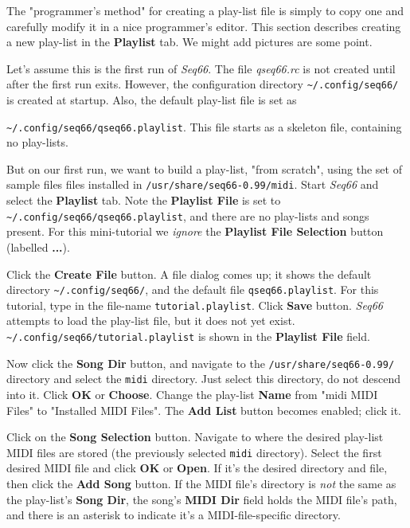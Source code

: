    The "programmer's method" for creating a play-list file is simply to copy
   one and carefully modify it in a nice programmer's editor.
   This section describes creating a new play-list in the \textbf{Playlist}
   tab.  We might add pictures are some point.

   Let's assume this is the first run of \textsl{Seq66}.
   The file \textsl{qseq66.rc} is not created until after the first
   run exits.
   However, the configuration directory
   \texttt{\textasciitilde/.config/seq66/} is created at startup.
   Also, the default play-list file is set as

   \texttt{\textasciitilde/.config/seq66/qseq66.playlist}.
   This file starts as a skeleton file, containing no play-lists.

   But on our first run, we want to build a play-list, "from scratch",
   using the set of sample files files installed in
   \texttt{/usr/share/seq66-0.99/midi}.
   Start \textsl{Seq66} and select the \textbf{Playlist} tab.
   Note the \textbf{Playlist File} is set to
   \texttt{\textasciitilde/.config/seq66/qseq66.playlist}, and
   there are no play-lists and songs present.
   For this mini-tutorial we \textsl{ignore}
   the \textbf{Playlist File Selection}
   button (labelled \textbf{...}).

   Click the \textbf{Create File} button.
   A file dialog comes up; it shows the default directory
   \texttt{\textasciitilde/.config/seq66/}, and the default file
   \texttt{qseq66.playlist}.
   For this tutorial, type in the file-name
   \texttt{tutorial.playlist}.
   Click \textbf{Save} button.
   \textsl{Seq66} attempts to load the play-list file, but it
   does not yet exist.
   \texttt{\textasciitilde/.config/seq66/tutorial.playlist} is
   shown in the \textbf{Playlist File} field.

   Now click the \textbf{Song Dir} button,
   and navigate to the
   \texttt{/usr/share/seq66-0.99/} directory and select the
   \texttt{midi} directory.
   Just select this directory, do not descend into it.
   Click \textbf{OK} or \textbf{Choose}.
   Change the play-list \textbf{Name} from
   "midi MIDI Files" to "Installed MIDI Files".
   The \textbf{Add List} button becomes enabled; click it.
   
   Click on the \textbf{Song Selection} button.
   Navigate to where the desired play-list MIDI files are stored
   (the previously selected \texttt{midi} directory).
   Select the first desired MIDI file and click \textbf{OK} or
   \textbf{Open}.
   If it's the desired directory and file,
   then click the \textbf{Add Song} button.
   If the MIDI file's directory is \textsl{not} the same as the play-list's
   \textbf{Song Dir},
   the song's \textbf{MIDI Dir} field holds the MIDI file's
   path, and there is an asterisk to indicate it's a
   MIDI-file-specific directory.

